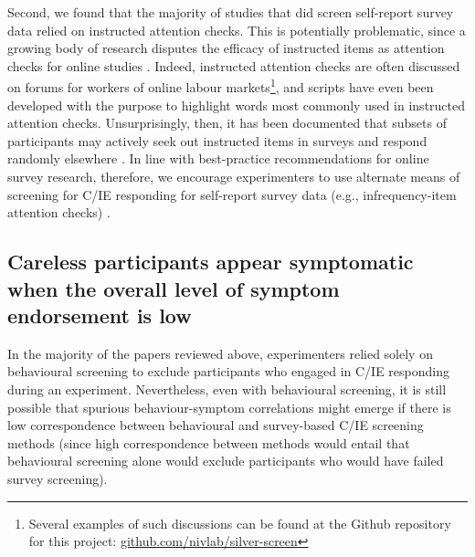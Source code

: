 \documentclass[a4paper,notitlepage,12pt]{article}
\begin{document}
Second, we found that the majority of studies that did screen self-report survey data relied on instructed attention checks. This is potentially problematic, since a growing body of research disputes the efficacy of instructed items as attention checks for online studies \cite{barends2019noncompliant, thomas2017validity, hauser2016attentive}. Indeed, instructed attention checks are often discussed on forums for workers of online labour markets\footnote{Several examples of such discussions can be found at the Github repository for this project:  \url{github.com/nivlab/silver-screen}}, and scripts have even been developed with the purpose to highlight words most commonly used in instructed attention checks. Unsurprisingly, then, it has been documented that subsets of participants may actively seek out instructed items in surveys and respond randomly elsewhere \cite{barends2019noncompliant}. In line with best-practice recommendations for online survey research, therefore, we encourage experimenters to use alternate means of screening for C/IE responding for self-report survey data (e.g., infrequency-item attention checks) \cite{huang2015detecting}.

\subsection{Careless participants appear symptomatic when the overall level of symptom endorsement is low}

In the majority of the papers reviewed above, experimenters relied solely on behavioural screening to exclude participants who engaged in C/IE responding during an experiment. Nevertheless, even with behavioural screening, it is still possible that spurious behaviour-symptom correlations might emerge if there is low correspondence between behavioural and survey-based C/IE screening methods (since high correspondence between methods would entail that behavioural screening alone would exclude participants who would have failed survey screening).
\end{document}
